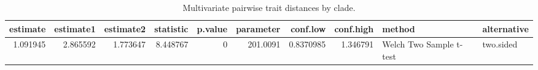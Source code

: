\begin{table}

\caption{Multivariate pairwise trait distances by clade.}
\centering
\fontsize{8}{10}\selectfont
\begin{tabular}[t]{rrrrrrrrll}
\toprule
estimate & estimate1 & estimate2 & statistic & p.value & parameter & conf.low & conf.high & method & alternative\\
\midrule
1.091945 & 2.865592 & 1.773647 & 8.448767 & 0 & 201.0091 & 0.8370985 & 1.346791 & Welch Two Sample t-test & two.sided\\
\bottomrule
\end{tabular}
\end{table}